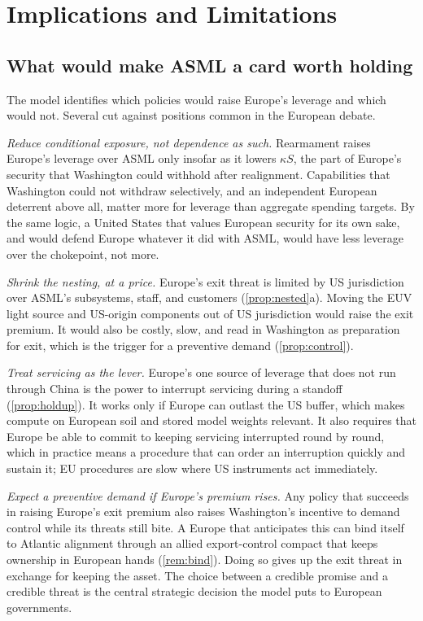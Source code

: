 \section{Implications and Limitations}\label{sec:implications}

\subsection{What would make ASML a card worth holding}

The model identifies which policies would raise Europe's leverage and which would not. Several cut against positions common in the European debate.

\emph{Reduce conditional exposure, not dependence as such.} Rearmament raises Europe's leverage over ASML only insofar as it lowers $\kappa S$, the part of Europe's security that Washington could withhold after realignment. Capabilities that Washington could not withdraw selectively, and an independent European deterrent above all, matter more for leverage than aggregate spending targets. By the same logic, a United States that values European security for its own sake, and would defend Europe whatever it did with ASML, would have less leverage over the chokepoint, not more.

\emph{Shrink the nesting, at a price.} Europe's exit threat is limited by US jurisdiction over ASML's subsystems, staff, and customers (\cref{prop:nested}a). Moving the EUV light source and US-origin components out of US jurisdiction would raise the exit premium. It would also be costly, slow, and read in Washington as preparation for exit, which is the trigger for a preventive demand (\cref{prop:control}).

\emph{Treat servicing as the lever.} Europe's one source of leverage that does not run through China is the power to interrupt servicing during a standoff (\cref{prop:holdup}). It works only if Europe can outlast the US buffer, which makes compute on European soil and stored model weights relevant. It also requires that Europe be able to commit to keeping servicing interrupted round by round, which in practice means a procedure that can order an interruption quickly and sustain it; EU procedures are slow where US instruments act immediately.

\emph{Expect a preventive demand if Europe's premium rises.} Any policy that succeeds in raising Europe's exit premium also raises Washington's incentive to demand control while its threats still bite. A Europe that anticipates this can bind itself to Atlantic alignment through an allied export-control compact that keeps ownership in European hands (\cref{rem:bind}). Doing so gives up the exit threat in exchange for keeping the asset. The choice between a credible promise and a credible threat is the central strategic decision the model puts to European governments.

